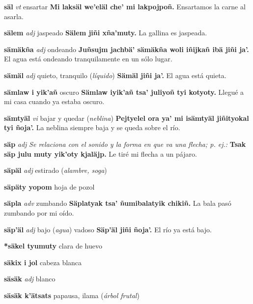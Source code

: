 \documentclass[10pt]{scrbook}
\newcommand{\entry}[1]{\textbf{#1}}
\newcommand{\nontranslationdef}[1]{\textit{#1}}
\newcommand{\partofspeech}[1]{\textit{#1}}
\newcommand{\spanishtranslation}[1]{#1}
\newcommand{\clarification}[1]{(\textit{#1})}
\newcommand{\cholexample}[1]{\textbf{#1}}
\newcommand{\exampletranslation}[1]{#1}
\begin{document}
\begin{multicols}{2}
\entry{säl}
\partofspeech{vt}
\spanishtranslation{ensartar}
\cholexample{Mi laksäl we'eläl che' mi lakpojpoñ.}
\exampletranslation{Ensartamos la carne al asarla.}

\entry{sälem}
\partofspeech{adj}
\spanishtranslation{jaspeado}
\cholexample{Sälem jiñi xña'muty.}
\exampletranslation{La gallina es jaspeada.}

\entry{sämäkña}
\partofspeech{adj}
\spanishtranslation{ondeando}
\cholexample{Juñsujm jachbä' sämäkña woli iñijkañ ibä jiñi ja'.}
\exampletranslation{El agua está ondeando tranquilamente en un sólo lugar.}

\entry{sämäl}
\partofspeech{adj}
\spanishtranslation{quieto, tranquilo}
\clarification{líquido}
\cholexample{Sämäl jiñi ja'.}
\exampletranslation{El agua está quieta.}

\entry{sämlaw i yik'añ}
\spanishtranslation{oscuro}
\cholexample{Sämlaw iyik'añ tsa' juliyoñ tyi kotyoty.}
\exampletranslation{Llegué a mi casa cuando ya estaba oscuro.}

\entry{sämtyäl}
\partofspeech{vi}
\spanishtranslation{bajar y quedar}
\clarification{neblina}
\cholexample{Pejtyelel ora ya' mi isämtyäl jiñityokal tyi ñoja'.}
\exampletranslation{La neblina siempre baja y se queda sobre el río.}

\entry{säp}
\partofspeech{adj}
\nontranslationdef{Se relaciona con el sonido y la forma en que va una flecha; p. ej.:}
\cholexample{Tsak säp julu muty yik'oty kjaläjp.}
\exampletranslation{Le tiré mi flecha a un pájaro.}

\entry{säpäl}
\partofspeech{adj}
\spanishtranslation{estirado}
\clarification{alambre, soga}

\entry{säpäty yopom}
\spanishtranslation{hoja de pozol}

\entry{säpla}
\partofspeech{adv}
\spanishtranslation{zumbando}
\cholexample{Säplatyak tsa' ñumibalatyik chikiñ.}
\exampletranslation{La bala pasó zumbando por mi oído.}

\entry{säp'äl}
\partofspeech{adj}
\spanishtranslation{bajo}
\clarification{agua}
\spanishtranslation{vadoso}
\cholexample{Säp'äl jiñi ñoja'.}
\exampletranslation{El río ya está bajo.}

\entry{*säkel tyumuty}
\spanishtranslation{clara de huevo}

\entry{säkix i jol}
\spanishtranslation{cabeza blanca}

\entry{säsäk}
\partofspeech{adj}
\spanishtranslation{blanco}

\entry{säsäk k'ätsats}
\spanishtranslation{papausa, ilama}
\clarification{árbol frutal}


\end{multicols}
\end{document}
